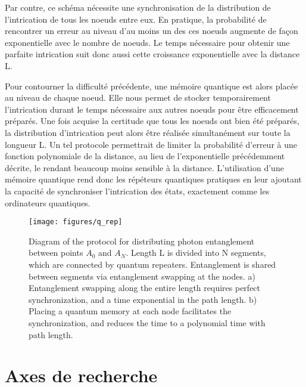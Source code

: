 Par contre, ce sch\'ema n\'ecessite une synchronisation de la distribution de l'intrication de tous les noeuds entre eux.  En pratique, la probabilit\'e de rencontrer un erreur au niveau d'au moins un des ces noeuds augmente de fa\c{c}on exponentielle avec le nombre de noeuds. Le temps n\'ecessaire pour obtenir une parfaite intrication suit donc aussi cette croissance exponentielle avec la distance L.

Pour contourner la difficult\'e pr\'ec\'edente, une m\'emoire quantique est alors plac\'ee au niveau de chaque noeud. Elle nous permet de stocker temporairement l'intrication durant le temps n\'ecessaire aux autres noeuds pour \^etre efficacement pr\'epar\'es. Une fois acquise la certitude que tous les noeuds ont bien \'et\'e pr\'epar\'es, la distribution d'intrication peut alors \^etre r\'ealis\'ee simultan\'ement sur toute la longueur L. Un tel protocole permettrait de limiter la probabilit\'e d'erreur \`a une fonction polynomiale de la distance, au lieu de l'exponentielle pr\'ec\'edemment d\'ecrite, le rendant beaucoup moins sensible \`a la distance. L'utilisation d'une m\'emoire quantique rend donc les r\'ep\'eteurs quantiques pratiques en leur ajoutant la capacit\'e de synchroniser l'intrication des \'etats, exactement comme les ordinateurs quantiques. 


\begin{figure}[!ht] 
 \centering 
 \texttt{[image: figures/q\_rep]} 
 \caption[Quantum repeater schematic]{Diagram of the protocol for
distributing photon entanglement between points $A_0$ and $A_N$.  Length L is
divided into N segments, which are connected by quantum repeaters.
Entanglement is shared between segments via entanglement swapping at the
nodes.  a)  Entanglement swapping along the entire length requires perfect
synchronization, and a time exponential in the path length.  b)  Placing a
quantum memory at each node facilitates the synchronization, and reduces the
time to a polynomial time with path length.} 
 \label{fig:q_rep_fr} 
\end{figure}







\section*{Axes de recherche}

